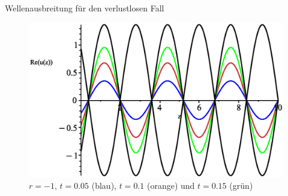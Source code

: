 \documentclass{beamer}
\begin{document}
\begin{frame}{Wellenausbreitung für den verlustlosen Fall}
\begin{figure}[H]
\begin{minipage}{0.32\textwidth}
        \end{minipage}
        \hfill
        \begin{minipage}{0.32\textwidth}
            \centering
            \includegraphics[width=\linewidth]{../graphics/Enveloppe/verlustlos/R-1}
            \caption*{$r=-1$, $t=0.05$ (blau), $t=0.1$ (orange) und $t=0.15$ (grün)}
        \end{minipage}
    \end{figure}
\end{frame}
\end{document}
